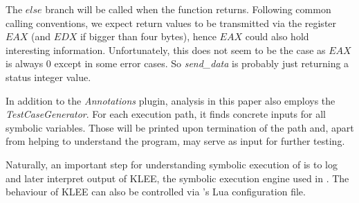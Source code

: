 The $else$ branch will be called when the function returns.
Following common calling conventions, we expect return values to be transmitted via the register $EAX$ (and $EDX$ if bigger than four bytes), hence $EAX$ could also hold interesting information.
Unfortunately, this does not seem to be the case as $EAX$ is always $0$ except in some error cases.
So \textit{send\_data} is probably just returning a status integer value.










\bigskip

In addition to the \textit{Annotations} plugin, analysis in this paper also employs the \textit{TestCaseGenerator}.
For each execution path, it finds concrete inputs for all symbolic variables.
Those will be printed upon termination of the path and, apart from helping to understand the program, may serve as input for further testing.

\bigskip

Naturally, an important step for understanding symbolic execution of \app is to log and later interpret output of KLEE, the symbolic execution engine used in \sse.
The behaviour of KLEE can also be controlled via \sse's Lua configuration file.



\iffalse
§5 	Implementation (of the test case using S2E)
		> Vorgehen
		> Verwendete Konsistenzmodelle
		> Arbeitsweise von Selektoren/Analysatoren
\fi